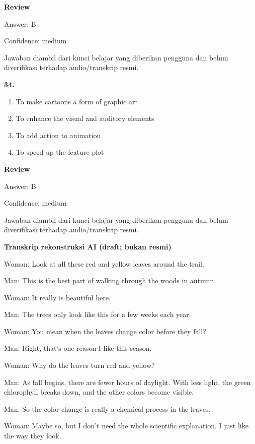 \documentclass[12pt]{article}
\begin{document}
\begingroup
\setlength{\parskip}{0pt}
\setlength{\parindent}{0pt}
\textbf{Review}\par
Answer: B\par
Confidence: medium\par
Jawaban diambil dari kunci belajar yang diberikan pengguna dan belum diverifikasi terhadap audio/transkrip resmi.\par
\endgroup
\par
\vspace{0.25\baselineskip}
\noindent\textbf{34.}
\begin{enumerate}[label=(\Alph*),leftmargin=*,itemsep=0.2em]
\item To make cartoons a form of graphic art
\item To enhance the visual and auditory elements
\item To add action to animation
\item To speed up the feature plot
\end{enumerate}
\par
\begingroup
\setlength{\parskip}{0pt}
\setlength{\parindent}{0pt}
\textbf{Review}\par
Answer: B\par
Confidence: medium\par
Jawaban diambil dari kunci belajar yang diberikan pengguna dan belum diverifikasi terhadap audio/transkrip resmi.\par
\endgroup
\par
\vspace{0.25\baselineskip}
\begin{exampleblock}
\textbf{Transkrip rekonstruksi AI (draft; bukan resmi)}\par
Woman: Look at all these red and yellow leaves around the trail.\par
Man: This is the best part of walking through the woods in autumn.\par
Woman: It really is beautiful here.\par
Man: The trees only look like this for a few weeks each year.\par
Woman: You mean when the leaves change color before they fall?\par
Man: Right, that's one reason I like this season.\par
Woman: Why do the leaves turn red and yellow?\par
Man: As fall begins, there are fewer hours of daylight. With less light, the green chlorophyll breaks down, and the other colors become visible.\par
Man: So the color change is really a chemical process in the leaves.\par
Woman: Maybe so, but I don't need the whole scientific explanation. I just like the way they look.\par
\end{exampleblock}
\end{document}
